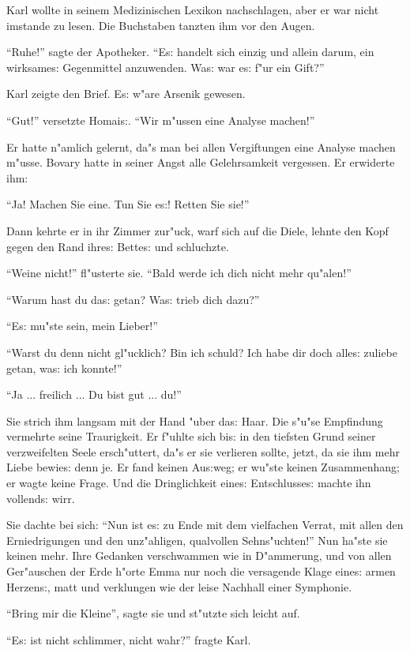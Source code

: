 \documentclass[oneside,12pt]{book}
\newcommand{\s}{s:}%
\begin{document}
Karl wollte in seinem Medizinischen Lexikon nachschlagen, aber er
war nicht imstande zu lesen. Die Buchstaben tanzten ihm vor den
Augen.

"`Ruhe!"' sagte der Apotheker. "`E{\s} handelt sich einzig und
allein darum, ein wirksame{\s} Gegenmittel anzuwenden. Wa{\s} war
e{\s} f"ur ein Gift?"'

Karl zeigte den Brief. E{\s} w"are Arsenik gewesen.

"`Gut!"' versetzte Homai{\s}. "`Wir m"ussen eine Analyse machen!"'

Er hatte n"amlich gelernt, da"s man bei allen Vergiftungen eine
Analyse machen m"usse. Bovary hatte in seiner Angst alle
Gelehrsamkeit vergessen. Er erwiderte ihm:

"`Ja! Machen Sie eine. Tun Sie e{\s}! Retten Sie sie!"'

Dann kehrte er in ihr Zimmer zur"uck, warf sich auf die Diele,
lehnte den Kopf gegen den Rand ihre{\s} Bette{\s} und schluchzte.

"`Weine nicht!"' fl"usterte sie. "`Bald werde ich dich nicht mehr
qu"alen!"'

"`Warum hast du da{\s} getan? Wa{\s} trieb dich dazu?"'

"`E{\s} mu"ste sein, mein Lieber!"'

"`Warst du denn nicht gl"ucklich? Bin ich schuld? Ich habe dir
doch alle{\s} zuliebe getan, wa{\s} ich konnte!"'

"`Ja ... freilich ... Du bist gut ... du!"'

Sie strich ihm langsam mit der Hand "uber da{\s} Haar. Die s"u"se
Empfindung vermehrte seine Traurigkeit. Er f"uhlte sich bi{\s} in
den tiefsten Grund seiner verzweifelten Seele ersch"uttert, da"s
er sie verlieren sollte, jetzt, da sie ihm mehr Liebe bewie{\s}
denn je. Er fand keinen Au{\s}weg; er wu"ste keinen Zusammenhang;
er wagte keine Frage. Und die Dringlichkeit eine{\s}
Entschlusse{\s} machte ihn vollend{\s} wirr.

Sie dachte bei sich: "`Nun ist e{\s} zu Ende mit dem vielfachen
Verrat, mit allen den Erniedrigungen und den unz"ahligen,
qualvollen Sehns"uchten!"' Nun ha"ste sie keinen mehr. Ihre
Gedanken verschwammen wie in D"ammerung, und von allen Ger"auschen
der Erde h"orte Emma nur noch die versagende Klage eine{\s} armen
Herzen{\s}, matt und verklungen wie der leise Nachhall einer
Symphonie.

"`Bring mir die Kleine"', sagte sie und st"utzte sich leicht auf.

"`E{\s} ist nicht schlimmer, nicht wahr?"' fragte Karl.
\end{document}
